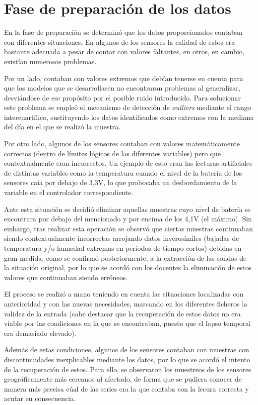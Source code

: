 \section{Fase de preparación de los datos}
En la fase de preparación se determinó que los datos proporcionados contaban con diferentes situaciones. En algunos
de los sensores la calidad de estos era bastante adecuada a pesar de contar con valores faltantes, en otros, en cambio,
existían numerosos problemas.

Por un lado, contaban con valores extremos que debían tenerse en cuenta para que los modelos que se desarrollasen no 
encontraran problemas al generalizar, desviándose de ese propósito por el posible ruido introducido.
Para solucionar este problema se empleó el mecanismo de detección de \textit{outliers} mediante el rango intercuartílico,
sustituyendo los datos identificados como extremos con la mediana del día en el que se realizó la muestra.

Por otro lado, algunos de los sensores contaban con valores matemáticamente correctos (dentro de límites lógicos de las 
diferentes variables) pero que contextualmente eran incorrectos. Un ejemplo de esto eran las lecturas artificiales de 
distintas variables como la temperatura cuando el nivel de la batería de los sensores caía por debajo de 3,3V, lo que
probocaba un desbordamiento de la variable en el controlador correspondiente.

Ante esta situación se decidió eliminar aquellas muestras cuyo nivel de batería se encontrara por debajo del mencionado
y por encima de los 4,1V (el máximo). Sin embargo, tras realizar esta operación se observó que ciertas 
muestras continuaban siendo contextualmente incorrectas arrojando datos inverosímiles (bajadas de temperatura y/o 
humedad extremas en periodos de tiempo cortos) debidas en gran medida, como se confirmó posteriormente, 
a la extracción de las sondas de la situación original, por lo que se acordó con los docentes la eliminación de estos 
valores que continuaban siendo erróneos.

El proceso se realizó a mano teniendo en cuenta las situaciones localizadas con anterioridad y con las nuevas necesidades,
marcando en los diferentes ficheros la validez de la entrada (cabe destacar que la recuperación de estos datos no era viable 
por las condiciones en la que se encontraban, puesto que el lapso temporal era demasiado elevado).

Además de estas condiciones, algunos de los sensores contaban con muestras con discontinuidades inexplicables 
mediante los datos, por lo que se acordó el intento de la recuperación de estos. Para ello, se observaron los muestreos
de los sensores geográficamente más cercanos al afectado, de forma que se pudiera conocer de manera más 
precisa cúal de las series era la que contaba con la lecura correcta y acutar en consecuencia.

